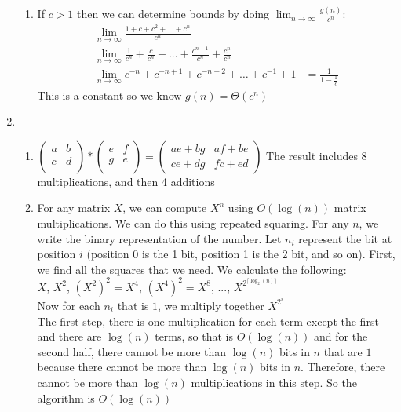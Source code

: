 \documentclass[11pt]{article}
\begin{document}
\begin{enumerate}
\begin{enumerate}
\item 
If $c>1$ then we can determine bounds by doing $\lim_{n\to\infty}\frac{g(n)}{c^n}$: 
\begin{align*}
\lim_{n\to\infty}\frac{1+c+c^2+…+c^n}{c^n}\\
\lim_{n\to\infty} \frac{1}{c^n}+\frac{c}{c^n}+...+\frac{c^{n-1}}{c^n}+\frac{c^n}{c^n}\\
\lim_{n\to\infty} c^{-n}+c^{-n+1}+c^{-n+2}+…+c^{-1}+1&=\frac{1}{1-\frac{1}{c}}
\end{align*}
This is a constant so we know $g(n)=\Theta(c^n)$
\end{enumerate}

\newpage

\item 


\begin{enumerate}

\item 
$\begin{pmatrix}
a&b\\
c&d\\
\end{pmatrix} *
\begin{pmatrix}
e&f\\
g&e\\
\end{pmatrix}=\begin{pmatrix}ae+bg&af+be\\ce+dg&fc+ed\end{pmatrix}
$
 The result includes 8 multiplications, and then 4 additions
\item 
For any matrix $X$, we can compute $X^n$ using $O(\log(n))$ matrix multiplications. We can do this using repeated squaring. For any $n$, we write the binary representation of the number. Let $n_i$ represent the bit at position $i$ (position 0 is the 1 bit, position 1 is the 2 bit, and so on). First, we find all the squares that we need. We calculate the following:\\
$X$, $X^2$, $(X^2)^2=X^4$, $(X^4)^2=X^8$, ..., $X^{2^{\lceil \log_2(n)\rceil}}$\\
Now for each $n_i$ that is $1$, we multiply together $X^{2^{i}}$\\
The first step, there is one multiplication for each term except the first and there are $\log(n)$ terms, so that is $O(\log(n))$ and for the second half, there cannot be more than $\log(n)$ bits in $n$ that are $1$ because there cannot be more than $\log(n)$ bits in $n$. Therefore, there cannot be more than $\log(n)$ multiplications in this step. So the algorithm is $O(\log(n))$


\end{enumerate}
\end{enumerate}
\end{document}
